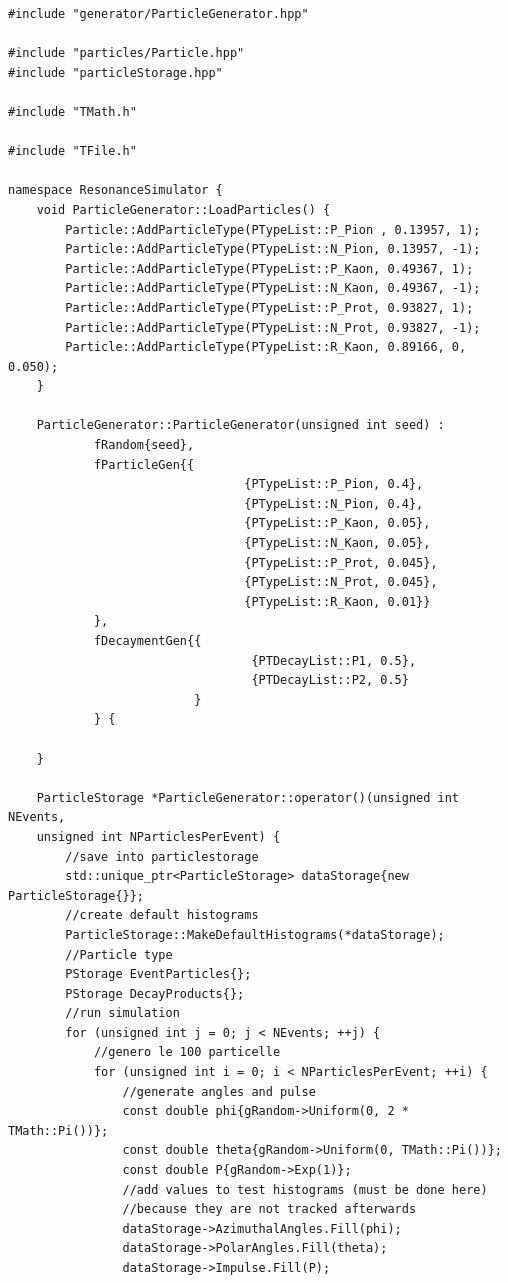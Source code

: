 \documentclass[12pt, a4paper]{article}
\begin{document}
\begin{verbatim}
#include "generator/ParticleGenerator.hpp"

#include "particles/Particle.hpp"
#include "particleStorage.hpp"

#include "TMath.h"

#include "TFile.h"

namespace ResonanceSimulator {
    void ParticleGenerator::LoadParticles() {
        Particle::AddParticleType(PTypeList::P_Pion , 0.13957, 1);
        Particle::AddParticleType(PTypeList::N_Pion, 0.13957, -1);
        Particle::AddParticleType(PTypeList::P_Kaon, 0.49367, 1);
        Particle::AddParticleType(PTypeList::N_Kaon, 0.49367, -1);
        Particle::AddParticleType(PTypeList::P_Prot, 0.93827, 1);
        Particle::AddParticleType(PTypeList::N_Prot, 0.93827, -1);
        Particle::AddParticleType(PTypeList::R_Kaon, 0.89166, 0, 0.050);
    }

    ParticleGenerator::ParticleGenerator(unsigned int seed) :
            fRandom{seed},
            fParticleGen{{
                                 {PTypeList::P_Pion, 0.4},
                                 {PTypeList::N_Pion, 0.4},
                                 {PTypeList::P_Kaon, 0.05},
                                 {PTypeList::N_Kaon, 0.05},
                                 {PTypeList::P_Prot, 0.045},
                                 {PTypeList::N_Prot, 0.045},
                                 {PTypeList::R_Kaon, 0.01}}
            },
            fDecaymentGen{{
                                  {PTDecayList::P1, 0.5},
                                  {PTDecayList::P2, 0.5}
                          }
            } {

    }

    ParticleStorage *ParticleGenerator::operator()(unsigned int NEvents, 
    unsigned int NParticlesPerEvent) {
        //save into particlestorage
        std::unique_ptr<ParticleStorage> dataStorage{new ParticleStorage{}};
        //create default histograms
        ParticleStorage::MakeDefaultHistograms(*dataStorage);
        //Particle type
        PStorage EventParticles{};
        PStorage DecayProducts{};
        //run simulation
        for (unsigned int j = 0; j < NEvents; ++j) {
            //genero le 100 particelle
            for (unsigned int i = 0; i < NParticlesPerEvent; ++i) {
                //generate angles and pulse
                const double phi{gRandom->Uniform(0, 2 * TMath::Pi())};
                const double theta{gRandom->Uniform(0, TMath::Pi())};
                const double P{gRandom->Exp(1)};
                //add values to test histograms (must be done here)
                //because they are not tracked afterwards
                dataStorage->AzimuthalAngles.Fill(phi);
                dataStorage->PolarAngles.Fill(theta);
                dataStorage->Impulse.Fill(P);


\end{verbatim}
\end{document}
